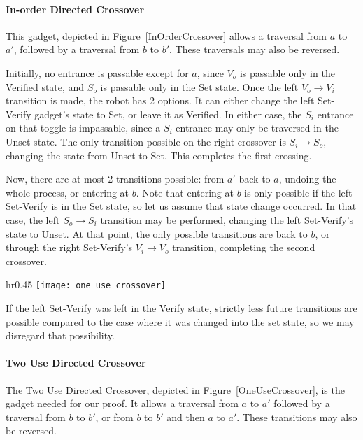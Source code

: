 \paragraph{In-order Directed Crossover} This gadget, depicted in Figure~\ref{InOrderCrossover} allows a traversal from $a$ to $a'$, followed by a traversal from $b$ to $b'$. These traversals may also be reversed.

Initially, no entrance is passable except for $a$, since $V_o$ is passable only in the Verified state, and $S_o$ is
passable only in the Set state. Once the left $V_o \rightarrow V_i$ transition is made, the robot has 2 options.
It can either change the left Set-Verify gadget's state to Set, or leave it as Verified. In either case, the $S_i$
entrance on that toggle is impassable, since a $S_i$ entrance may only be traversed in the Unset state. The
only transition possible on the right crossover is $S_i \rightarrow S_o$, changing the state from Unset to Set.
This completes the first crossing.

Now, there are at most 2 transitions possible: from $a'$ back to $a$, undoing the whole process, or entering at $b$. Note that entering at $b$ is only possible if the left Set-Verify is in the Set state, so let us assume that state change occurred. In that case, the left $S_o \rightarrow S_i$ transition may be performed, changing the left Set-Verify's state to Unset. At that point, the only possible transitions are back to $b$, or through the right Set-Verify's
$V_i \rightarrow V_o$ transition, completing the second crossover.

\begin{wrapfigure}{hr}{0.45\textwidth}
\vspace{-5mm}
  \centering
    \texttt{[image: one\_use\_crossover]}
    \caption{The one use directed crossover is constructed from a directed destructive crossover and two in-order directed crossovers.}
    \label{OneUseCrossover}
    \vspace{-7mm}
\end{wrapfigure}

If the left Set-Verify was left in the Verify state, strictly less future transitions are possible compared to the case where it was changed into the set state, so we may disregard that possibility.


\paragraph{Two Use Directed Crossover} 
The Two Use Directed Crossover, depicted in Figure~\ref{OneUseCrossover}, is the gadget needed for our proof. It allows a traversal from $a$ to $a'$ followed by a traversal from $b$ to $b'$, or from $b$ to $b'$ and then $a$ to $a'$. These transitions may also be reversed.

